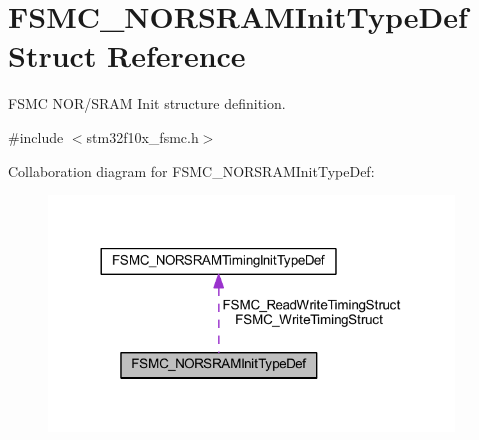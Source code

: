 \hypertarget{struct_f_s_m_c___n_o_r_s_r_a_m_init_type_def}{}\section{F\+S\+M\+C\+\_\+\+N\+O\+R\+S\+R\+A\+M\+Init\+Type\+Def Struct Reference}
\label{struct_f_s_m_c___n_o_r_s_r_a_m_init_type_def}


F\+S\+MC N\+O\+R/\+S\+R\+AM Init structure definition.  




{\ttfamily \#include $<$stm32f10x\+\_\+fsmc.\+h$>$}



Collaboration diagram for F\+S\+M\+C\+\_\+\+N\+O\+R\+S\+R\+A\+M\+Init\+Type\+Def\+:
\nopagebreak
\begin{figure}[H]
\begin{center}
\leavevmode
\includegraphics[width=305pt]{struct_f_s_m_c___n_o_r_s_r_a_m_init_type_def__coll__graph}
\end{center}
\end{figure}
